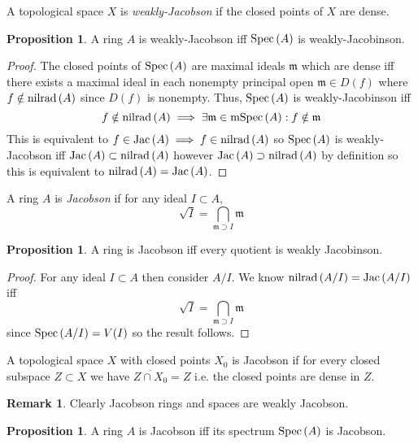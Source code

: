 \documentclass[12pt]{extarticle}
\theoremstyle{definition}
\newtheorem{proposition}[theorem]{Proposition}
\newtheorem{remark}{Remark}
\newenvironment{definition}[1][Definition:]{\begin{trivlist}
\item[\hskip \labelsep {\bfseries #1}]}{\end{trivlist}}
\newcommand{\m}{\mathfrak{m}}
\begin{document}
\begin{definition}
A topological space $X$ is \textit{weakly-Jacobson} if the closed points of $X$ are dense.
\end{definition}

\begin{proposition}
A ring $A$ is weakly-Jacobson iff $\mathrm{Spec}\left(A\right)$ is weakly-Jacobinson.
\end{proposition}

\begin{proof}
The closed points of $\mathrm{Spec}\left(A\right)$ are maximal ideals $\m$ which are dense iff there exists a maximal ideal in each nonempty principal open $\m \in D(f)$ where $f \notin \mathrm{nilrad}\left(A\right)$ since $D(f)$ is nonempty. Thus, $\mathrm{Spec}\left(A\right)$ is weakly-Jacobinson iff 
\[ f \notin \nilrad{A} \implies \exists \m \in \mSpec{A} : f \notin \m \]  
This is equivalent to $f \in \mathrm{Jac}\left( A \right) \implies f \in \mathrm{nilrad}\left(A\right)$ so $\mathrm{Spec}\left(A\right)$ is weakly-Jacobson iff $\mathrm{Jac}\left( A \right) \subset \mathrm{nilrad}\left(A\right)$ however $\mathrm{Jac}\left( A \right) \supset \mathrm{nilrad}\left(A\right)$ by definition so this is equivalent to $\mathrm{nilrad}\left(A\right) = \mathrm{Jac}\left( A \right)$.
\end{proof}

\begin{definition}
A ring $A$ is \textit{Jacobson} if for any ideal $I \subset A$,
\[ \sqrt{I} = \bigcap_{\m \supset I} \m \]
\end{definition}

\begin{proposition}
A ring is Jacobson iff every quotient is weakly Jacobinson.
\end{proposition}

\begin{proof}
For any ideal $I \subset A$ then consider $A / I$. We know $\mathrm{nilrad}\left(A / I\right) = \mathrm{Jac}\left( A / I \right)$ iff
\[ \sqrt{I} = \bigcap_{\m \supset I} \m \]
since $\mathrm{Spec}\left(A / I\right) = V(I)$ so the result follows.
\end{proof}

\begin{definition}
A topological space $X$ with closed points $X_0$ is Jacobson if for every closed subspace $Z \subset X$ we have $\overline{Z \cap X_0} = Z$ i.e. the closed points are dense in $Z$. 
\end{definition}

\begin{remark}
Clearly Jacobson rings and spaces are weakly Jacobson. 
\end{remark}

\begin{proposition}
A ring $A$ is Jacobson iff its spectrum $\mathrm{Spec}\left(A\right)$ is Jacobson.
\end{proposition}
\end{document}
